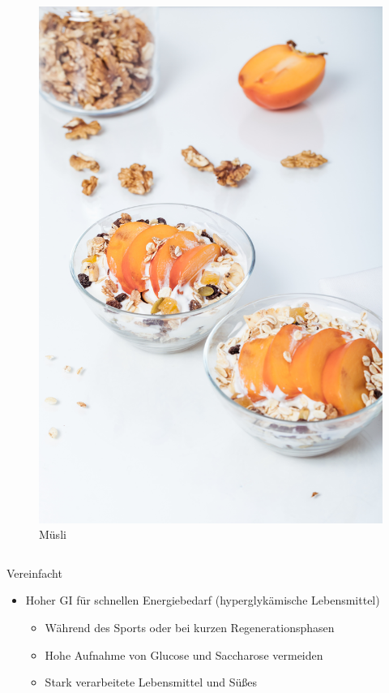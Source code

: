 \documentclass[ngerman, aspectratio=169]{beamer}
\begin{document}
\begin{frame}[allowframebreaks]
\begin{columns}
    \begin{column}{0.3\textwidth}
      \begin{figure}
        \centering
        \includegraphics[width=\textwidth, height=0.8\textheight, keepaspectratio]{images/alexander-mils-372238-unsplash.jpg}      
        \caption{Müsli \cite{mills2017vegan}}
        \label{fig:breakfast}
      \end{figure}
    \end{column}
  \end{columns}

  \framebreak

  Vereinfacht

  \begin{itemize}
  \item Hoher GI für schnellen Energiebedarf (hyperglykämische Lebensmittel)
    \begin{itemize}
    \item Während des Sports oder bei kurzen Regenerationsphasen
    \item Hohe Aufnahme von Glucose und Saccharose vermeiden
    \item Stark verarbeitete Lebensmittel und Süßes
    \end{itemize}


\end{itemize}
\end{frame}
\end{document}
